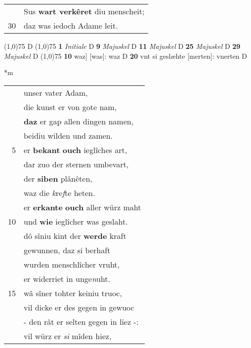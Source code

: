 \documentclass[8pt,a4paper,notitlepage]{article}
\begin{document}
\begin{table}[ht]
\begin{minipage}[t]{0.5\linewidth}
\begin{tabular}{rl}
 & Sus \textbf{wart verkêret} diu menscheit;\\ 
30 & daz was iedoch Adame leit.\\ 
\end{tabular}
\scriptsize
\line(1,0){75} \newline
D \newline
\line(1,0){75} \newline
\textbf{1} \textit{Initiale} D  \textbf{9} \textit{Majuskel} D  \textbf{11} \textit{Majuskel} D  \textbf{25} \textit{Majuskel} D  \textbf{29} \textit{Majuskel} D  \newline
\line(1,0){75} \newline
\textbf{10} waz] [was]: waz D \textbf{20} vnt si geslæhte [merten]: vnerten D \newline
\end{minipage}
\hspace{0.5cm}
\begin{minipage}[t]{0.5\linewidth}
\small
\begin{center}*m
\end{center}
\begin{tabular}{rl}
 & unser vater Adam,\\ 
 & die kunst er von gote nam,\\ 
 & \textbf{daz} er gap allen dingen namen,\\ 
 & beidiu wilden und zamen.\\ 
5 & er \textbf{bekant} \textbf{ouch} ieglîches art,\\ 
 & dar zuo der sternen umbevart,\\ 
 & der \textbf{siben} plânêten,\\ 
 & waz die \textit{k}re\textit{f}te heten.\\ 
 & er \textbf{erkante} \textbf{ouch} aller würz maht\\ 
10 & und \textbf{wie} ieglîcher was geslaht.\\ 
 & dô sîniu kint der \textbf{werde} kraft\\ 
 & gewunnen, daz si berhaft\\ 
 & wurden menschlîcher vruht,\\ 
 & er widerriet in unge\textit{n}uht.\\ 
15 & wâ sîner tohter keiniu truoc,\\ 
 & vil dicke er des gegen in gewuoc\\ 
 & - den rât er selten gegen in liez -:\\ 
 & vil würz er \textit{si} mîden hiez,\\ 

\end{tabular}
\end{minipage}
\end{table}
\end{document}

